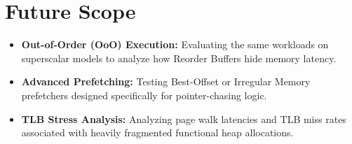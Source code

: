 \documentclass[12pt, a4paper]{report}
\begin{document}
\section{Future Scope}
\begin{itemize}
    \item \textbf{Out-of-Order (OoO) Execution:} Evaluating the same workloads on superscalar  models to analyze how Reorder Buffers hide memory latency.
    \item \textbf{Advanced Prefetching:} Testing Best-Offset or Irregular Memory prefetchers designed specifically for pointer-chasing logic.
    \item \textbf{TLB Stress Analysis:} Analyzing page walk latencies and TLB miss rates associated with heavily fragmented functional heap allocations.
\end{itemize}
\end{document}
